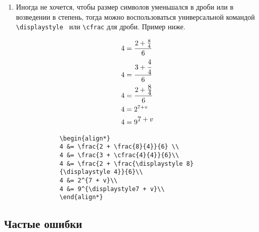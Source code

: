 \begin{enumerate}
	\item Иногда не хочется, чтобы размер символов уменьшался в дроби или в возведении в степень, тогда можно воспользоваться универсальной командой \verb|\displaystyle | или \verb|\cfrac| для дроби. Пример ниже.
	\begin{table}[!ht]
		\begin{multicols}{2}
			\begin{align*}
			4 &= \frac{2 + \frac{8}{4}}{6} \\
			4 &= \frac{3 + \cfrac{4}{4}}{6}\\
			4 &= \frac{2 + \frac{\displaystyle 8}
				{\displaystyle 4}}{6}\\
			4 &= 2^{7 + v}\\
			4 &= 9^{\displaystyle7 + v}\\
			\end{align*}   
			
			\columnbreak
			
			\begin{verbatim}
			\begin{align*}
			4 &= \frac{2 + \frac{8}{4}}{6} \\
			4 &= \frac{3 + \cfrac{4}{4}}{6}\\
			4 &= \frac{2 + \frac{\displaystyle 8}
			{\displaystyle 4}}{6}\\
			4 &= 2^{7 + v}\\
			4 &= 9^{\displaystyle7 + v}\\
			\end{align*}   
			\end{verbatim}
		\end{multicols}
	\end{table}
\end{enumerate}

\subsection{Частые ошибки}

